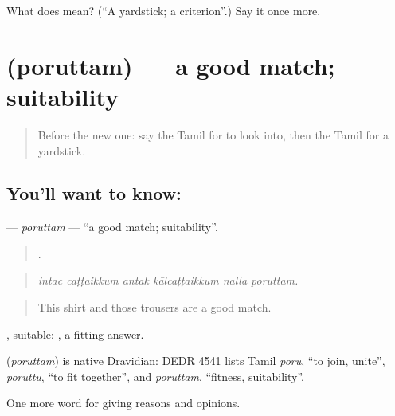 \begin{tcolorbox}[breakable,colback=teal!4,colframe=teal!35!black,title={Before you move on}]
What does  mean? (\textquotedblleft{}A yardstick; a criterion\textquotedblright{}.) Say it once more.
\end{tcolorbox}
\section[\texorpdfstring{\ta{பொருத்தம்} (poruttam)}{பொருத்தம் (poruttam)}]{ (poruttam) — a good match; suitability}

\label{lesson:TA-C361-poruttam}



\begin{quote}
Before the new one: say the Tamil for to look into, then the Tamil for a yardstick.
\end{quote}

\subsection*{You'll want to know: }
\textbf{} — \emph{poruttam} — \textquotedblleft{}a good match; suitability\textquotedblright{}.

\begin{quote}
     .
\end{quote}

\begin{quote}
\emph{intac caṭṭaikkum antak kālcaṭṭaikkum nalla poruttam.}
\end{quote}

\begin{quote}
This shirt and those trousers are a good match.
\end{quote}

, suitable:  , a fitting answer.

\begin{cousinweb}
\textbf{} (\emph{poruttam}) is native Dravidian: DEDR 4541 lists Tamil \emph{poru}, \textquotedblleft{}to join, unite\textquotedblright{}, \emph{poruttu}, \textquotedblleft{}to fit together\textquotedblright{}, and \emph{poruttam}, \textquotedblleft{}fitness, suitability\textquotedblright{}.
\end{cousinweb}

\begin{grammarlens}[title={What you've built}]
One more word for giving reasons and opinions.
\end{grammarlens}

